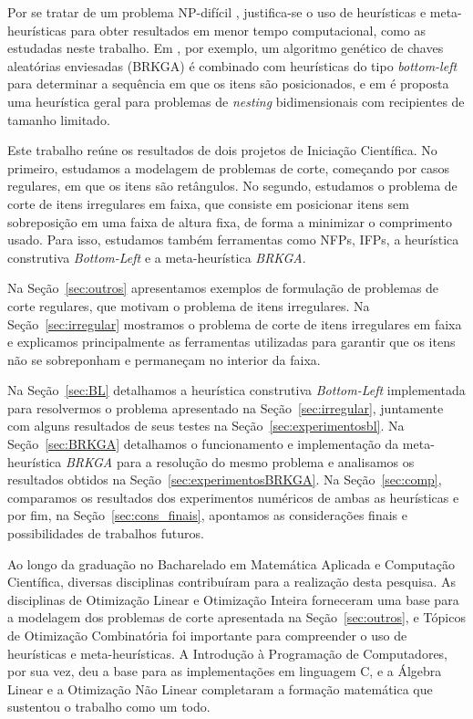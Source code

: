 \documentclass{article}
\begin{document}
Por se tratar de um problema NP-difícil \cite{key}, justifica-se o uso de heurísticas e meta-heurísticas para obter resultados em menor tempo computacional, como as estudadas neste trabalho. Em \cite{key}, por exemplo, um algoritmo genético de chaves aleatórias enviesadas (BRKGA) é combinado com heurísticas do tipo {\it bottom-left} para determinar a sequência em que os itens são posicionados, e em \cite{containers} é proposta uma heurística geral para problemas de {\it nesting} bidimensionais com recipientes de tamanho limitado.

Este trabalho reúne os resultados de dois projetos de Iniciação Científica. No primeiro, estudamos a modelagem de problemas de corte, começando por casos regulares, em que os itens são retângulos. No segundo, estudamos o problema de corte de itens irregulares em faixa, que consiste em posicionar itens sem sobreposição em uma faixa de altura fixa, de forma a minimizar o comprimento usado. Para isso, estudamos também ferramentas como NFPs, IFPs, a heurística construtiva {\it Bottom-Left} e a meta-heurística {\it BRKGA}.

Na Seção~\ref{sec:outros} apresentamos exemplos de formulação de problemas de corte regulares, que motivam o problema de itens irregulares. Na Seção~\ref{sec:irregular} mostramos o problema de corte de itens irregulares em faixa e explicamos principalmente as ferramentas utilizadas para garantir que os itens não se sobreponham e permaneçam no interior da faixa. 

Na Seção~\ref{sec:BL} detalhamos a heurística construtiva {\it Bottom-Left} implementada para resolvermos o problema apresentado na Seção~\ref{sec:irregular}, juntamente com alguns resultados de seus testes na Seção~\ref{sec:experimentosbl}. Na Seção~\ref{sec:BRKGA} detalhamos o funcionamento e implementação da meta-heurística {\it BRKGA} para a resolução do mesmo problema e analisamos os resultados obtidos na Seção~\ref{sec:experimentosBRKGA}. Na Seção~\ref{sec:comp}, comparamos os resultados dos experimentos numéricos de ambas as heurísticas e por fim, na Seção~\ref{sec:cons_finais}, apontamos as considerações finais e possibilidades de trabalhos futuros.

Ao longo da graduação no Bacharelado em Matemática Aplicada e Computação Científica, diversas disciplinas contribuíram para a realização desta pesquisa. As disciplinas de Otimização Linear e Otimização Inteira forneceram uma base para a modelagem dos problemas de corte apresentada na Seção~\ref{sec:outros}, e Tópicos de Otimização Combinatória foi importante para compreender o uso de heurísticas e meta-heurísticas. A Introdução à Programação de Computadores, por sua vez, deu a base para as implementações em linguagem C, e a Álgebra Linear e a Otimização Não Linear completaram a formação matemática que sustentou o trabalho como um todo.
\end{document}
